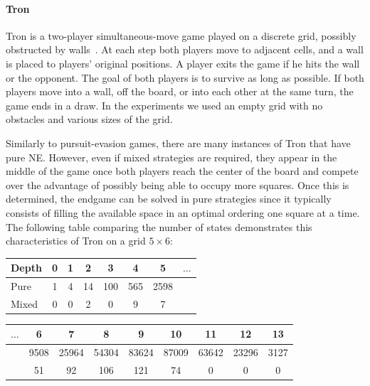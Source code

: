 \paragraph{\textbf{Tron}} 
Tron is a two-player simultaneous-move game played on a discrete grid, possibly obstructed by 
walls~\cite{Samothrakis10Tron,Perick12Comparison,Lanctot13Tron}.
At each step both players move to adjacent cells, and a wall is placed to players' original positions.
A player exits the game if he hits the wall or the opponent.
The goal of both players is to survive as long as possible. 
If both players move into a wall, off the board, or into each other at the same turn, the game ends in a draw.
In the experiments we used an empty grid with no obstacles and various sizes of the grid.

Similarly to pursuit-evasion games, there are many instances of Tron that have pure NE.
However, even if mixed strategies are required, they appear in the middle of the game once both players reach the center of the board and compete over the advantage of possibly being able to occupy more squares.
Once this is determined, the endgame can be solved in pure strategies since it typically consists of filling the available space in an optimal ordering one square at a time.
The following table comparing the number of states demonstrates this characteristics of Tron on a grid $5\times6$:

\begin{table}[h!]
\centering
\small
\begin{flushleft}
\begin{tabular}{|l|c|c|c|c|c|c|c|}
\hline Depth & 0 & 1 & 2 & 3 & 4 & 5 & $\ldots$\\
\hline Pure  & 1 & 4 & 14 & 100 & 565 & 2598 & \\
\hline Mixed & 0 & 0 & 2 & 0 & 9 & 7 & \\
\hline
\end{tabular}
\end{flushleft}
\begin{flushright}
\begin{tabular}{|c|c|c|c|c|c|c|c|c|}
\hline  $\ldots$ & 6 & 7 & 8 & 9 & 10 & 11 & 12 & 13\\
\hline  & 9508 & 25964 & 54304 & 83624 & 87009 & 63642 & 23296 & 3127\\
\hline  & 51 & 92 & 106 & 121 & 74 & 0 & 0 & 0 \\
\hline
\end{tabular}
\end{flushright}
\end{table}

